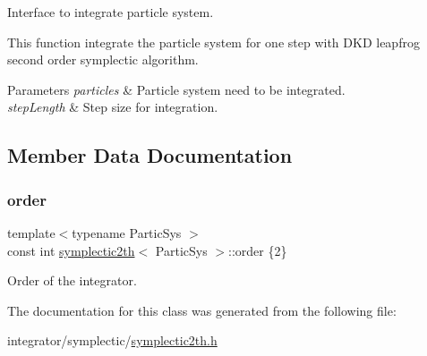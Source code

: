 Interface to integrate particle system. 

This function integrate the particle system for one step with D\+KD leapfrog second order symplectic algorithm. 
\begin{DoxyParams}{Parameters}
{\em particles} & Particle system need to be integrated. \\
\hline
{\em step\+Length} & Step size for integration. \\
\hline
\end{DoxyParams}


\subsection{Member Data Documentation}
\mbox{\label{classsymplectic2th_a1082d668c1081ff0116e8816f1240fcd}} 
\subsubsection{\texorpdfstring{order}{order}}
{\footnotesize\ttfamily template$<$typename Partic\+Sys $>$ \\
const int \mbox{\hyperlink{classsymplectic2th}{symplectic2th}}$<$ Partic\+Sys $>$\+::order \{2\}\hspace{0.3cm}{\ttfamily [static]}}



Order of the integrator. 



The documentation for this class was generated from the following file\+:\begin{DoxyCompactItemize}
\item 
integrator/symplectic/\mbox{\hyperlink{symplectic2th_8h}{symplectic2th.\+h}}\end{DoxyCompactItemize}
